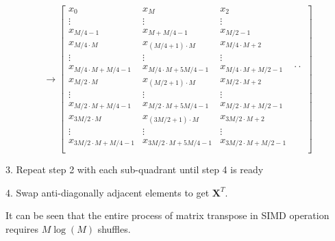 \begin{equation*}
    \label{eq:matrix_trans_step_2}
    \rightarrow 
    \left[\begin{array}{c|c|c|c}
        x_0 & x_M & x_2 &  \\ 
        \vdots & \vdots & \vdots & \\
        x_{M/4-1} & x_{M+M/4-1} & x_{M/2-1} & \\
        x_{M/4\cdot M} & x_{(M/4+1)\cdot M} & x_{M/4\cdot M+2} &  \\
        \vdots & \vdots & \vdots & \\
        x_{M/4\cdot M+M/4-1} & x_{M/4\cdot M+5M/4-1} & x_{M/4\cdot M+M/2-1} & \cdot\cdot \\
        x_{M/2\cdot M} & x_{(M/2+1)\cdot M} & x_{M/2\cdot M+2} &  \\ 
        \vdots & \vdots & \vdots & \\
        x_{M/2\cdot M+M/4-1} & x_{M/2\cdot M+5M/4-1} & x_{M/2\cdot M+M/2-1} & \\
        x_{3M/2\cdot M} & x_{(3M/2+1)\cdot M} & x_{3M/2\cdot M+2} &  \\
        \vdots & \vdots & \vdots & \\
        x_{3M/2\cdot M+M/4-1} & x_{3M/2\cdot M+5M/4-1} & x_{3M/2\cdot M+M/2-1} & \\    
    \end{array}\right]
\end{equation*}

3. Repeat step 2 with each sub-quadrant until step 4 is ready

4. Swap anti-diagonally adjacent elements to get $\bm{X}^T$.

It can be seen that the entire process of matrix transpose in SIMD operation requires $M\log(M)$
shuffles.
